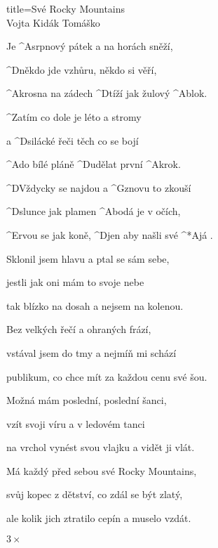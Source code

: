 \begin{song}{title=\predtitle\centering Své Rocky Mountains \\\large Vojta Kidák Tomáško  \vspace*{-0.3cm}}  %
\begin{centerjustified}

\sloka 
	Je ^{A\z}srpnový pátek a na horách sněží,

	^{D\z}někdo jde vzhůru, někdo si věří,
	
	^{A\z}krosna na zádech ^{D}tíží jak žulový ^{A\z}blok.
	
	^{\phantom{.}}Zatím co dole je léto a stromy
	
	a ^{D\z}silácké řeči těch co se bojí
	
	^{A}do bílé pláně ^{D\z}udělat první ^{A\z}krok.

	^{D\z}Vždycky se najdou a ^{G\z}znovu to zkouší
	
	^{D\z}slunce jak plamen ^{A\z}bodá je v očích,
	
	^{E\z}rvou se jak koně, ^{D}jen aby našli své ^*{A}já .

\sloka	
	Sklonil jsem hlavu a ptal se sám sebe,
	
	jestli jak oni mám to svoje nebe
	
	tak blízko na dosah a nejsem na kolenou.
	
	Bez velkých řečí a ohraných frází,
	
	vstával jsem do tmy a nejmíň mi schází
	
	publikum, co chce mít za každou cenu své šou.


\sloka
	Možná mám poslední, poslední šanci,
	
	vzít svoji víru a v ledovém tanci
	
	na vrchol vynést svou vlajku a vidět ji vlát.
	
	Má každý před sebou své Rocky Mountains,
	
	svůj kopec z dětství, co zdál se být zlatý,
	
	ale kolik jich ztratilo cepín a muselo vzdát. 

 $3\times$

\end{centerjustified}

\centering
{}

\setcounter{Slokočet}{0}
\end{song}
